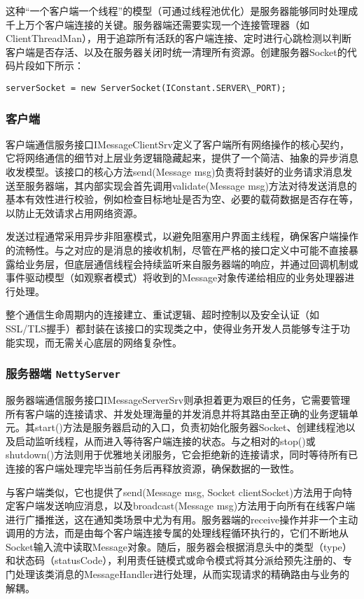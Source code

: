 这种“一个客户端一个线程”的模型（可通过线程池优化）是服务器能够同时处理成千上万个客户端连接的关键。服务器端还需要实现一个连接管理器（如ClientThreadMan），用于追踪所有活跃的客户端连接、定时进行心跳检测以判断客户端是否存活、以及在服务器关闭时统一清理所有资源。创建服务器Socket的代码片段如下所示：
\begin{lstlisting}
serverSocket = new ServerSocket(IConstant.SERVER\_PORT);
\end{lstlisting}

\subsubsection{客户端}
客户端通信服务接口IMessageClientSrv定义了客户端所有网络操作的核心契约，它将网络通信的细节对上层业务逻辑隐藏起来，提供了一个简洁、抽象的异步消息收发模型。该接口的核心方法send(Message msg)负责将封装好的业务请求消息发送至服务器端，其内部实现会首先调用validate(Message msg)方法对待发送消息的基本有效性进行校验，例如检查目标地址是否为空、必要的载荷数据是否存在等，以防止无效请求占用网络资源。

发送过程通常采用异步非阻塞模式，以避免阻塞用户界面主线程，确保客户端操作的流畅性。与之对应的是消息的接收机制，尽管在严格的接口定义中可能不直接暴露给业务层，但底层通信线程会持续监听来自服务器端的响应，并通过回调机制或事件驱动模型（如观察者模式）将收到的Message对象传递给相应的业务处理器进行处理。

整个通信生命周期内的连接建立、重试逻辑、超时控制以及安全认证（如SSL/TLS握手）都封装在该接口的实现类之中，使得业务开发人员能够专注于功能实现，而无需关心底层的网络复杂性。
\subsubsection{服务器端 \texttt{NettyServer}}
服务器端通信服务接口IMessageServerSrv则承担着更为艰巨的任务，它需要管理所有客户端的连接请求、并发处理海量的并发消息并将其路由至正确的业务逻辑单元。其start()方法是服务器启动的入口，负责初始化服务器Socket、创建线程池以及启动监听线程，从而进入等待客户端连接的状态。与之相对的stop()或shutdown()方法则用于优雅地关闭服务，它会拒绝新的连接请求，同时等待所有已连接的客户端处理完毕当前任务后再释放资源，确保数据的一致性。

与客户端类似，它也提供了send(Message msg, Socket clientSocket)方法用于向特定客户端发送响应消息，以及broadcast(Message msg)方法用于向所有在线客户端进行广播推送，这在通知类场景中尤为有用。服务器端的receive操作并非一个主动调用的方法，而是由每个客户端连接专属的处理线程循环执行的，它们不断地从Socket输入流中读取Message对象。随后，服务器会根据消息头中的类型（type）和状态码（statusCode），利用责任链模式或命令模式将其分派给预先注册的、专门处理该类消息的MessageHandler进行处理，从而实现请求的精确路由与业务的解耦。
